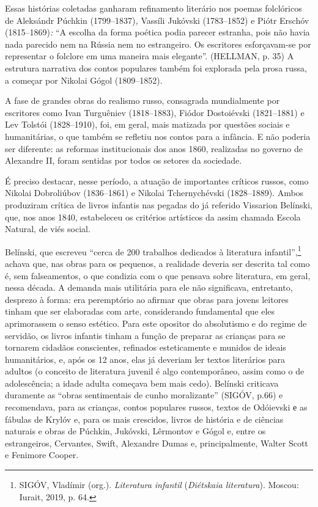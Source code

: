 Essas histórias coletadas ganharam refinamento literário nos poemas
folclóricos de Aleksándr Púchkin (1799--1837)\emph{,} Vassíli Jukóvski
(1783--1852) e Piótr Erschóv (1815--1869)\emph{:} ``A escolha da forma
poética podia parecer estranha, pois não havia nada parecido nem na
Rússia nem no estrangeiro. Os escritores esforçavam-se por representar o
folclore em uma maneira mais elegante''. (HELLMAN, p. 35) A estrutura
narrativa dos contos populares também foi explorada pela prosa russa, a
começar por Nikolai Gógol (1809--1852).

A fase de grandes obras do realismo russo, consagrada mundialmente por
escritores como Ivan Turguêniev (1818--1883), Fiódor Dostoiévski
(1821--1881) e Lev Tolstói (1828--1910), foi, em geral, mais matizada
por questões sociais e humanitárias, o que também se refletiu nos contos
para a infância. E não poderia ser diferente: as reformas institucionais
dos anos 1860, realizadas no governo de Alexandre II, foram sentidas por
todos os setores da sociedade.

É preciso destacar, nesse período, a atuação de importantes críticos
russos, como Nikolai Dobroliúbov (1836--1861) e Nikolai Tchernychévski
(1828--1889). Ambos produziram crítica de livros infantis nas pegadas do
já referido Vissarion Belínski, que, nos anos 1840, estabeleceu os
critérios artísticos da assim chamada Escola Natural, de viés social.

Belínski, que escreveu ``cerca de 200 trabalhos dedicados à literatura
infantil'',\footnote{SIGÓV, Vladímir (org.). \emph{Literatura infantil}
  (\emph{Diétskaia literatura}). Moscou: Iurait, 2019, p. 64.} achava
que, nas obras para os pequenos, a realidade deveria ser descrita tal
como é, sem falseamentos, o que condizia com o que pensava sobre
literatura, em geral, nessa década. A demanda mais utilitária para ele
não significava, entretanto, desprezo à forma: era peremptório ao
afirmar que obras para jovens leitores tinham que ser elaboradas com
arte, considerando fundamental que eles aprimorassem o senso estético.
Para este opositor do absolutismo e do regime de servidão, os livros
infantis tinham a função de preparar as crianças para se tornarem
cidadãos conscientes, refinados esteticamente e munidos de ideais
humanitários, e, após os 12 anos, elas já deveriam ler textos literários
para adultos (o conceito de literatura juvenil é algo contemporâneo,
assim como o de adolescência; a idade adulta começava bem mais cedo).
Belínski criticava duramente as ``obras sentimentais de cunho
moralizante'' (SIGÓV, p.66) e recomendava, para as crianças, contos
populares russos, textos de Odóievski е as fábulas de Krylóv e, para os
mais crescidos, livros de história e de ciências naturais e obras de
Púchkin, Jukóvski, Lêrmontov e Gógol e, entre os estrangeiros,
Cervantes, Swift, Alexandre Dumas e, principalmente, Walter Scott e
Fenimore Cooper.

